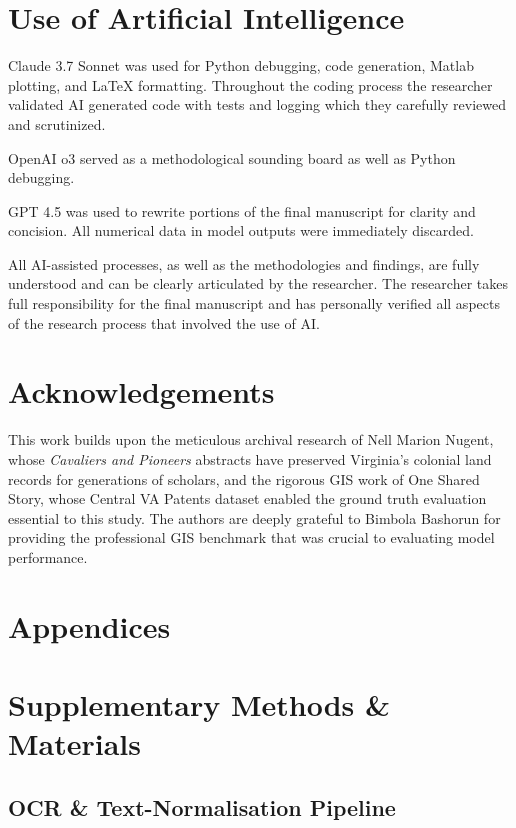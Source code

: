 \section{Use of Artificial
Intelligence}\label{use-of-artificial-intelligence}

Claude 3.7 Sonnet was used for Python debugging, code generation, Matlab
plotting, and LaTeX formatting. Throughout the coding process the
researcher validated AI generated code with tests and logging which they
carefully reviewed and scrutinized.

OpenAI o3 served as a methodological sounding board as well as Python
debugging.

GPT 4.5 was used to rewrite portions of the final manuscript for clarity
and concision. All numerical data in model outputs were immediately
discarded.

All AI-assisted processes, as well as the methodologies and findings,
are fully understood and can be clearly articulated by the researcher.
The researcher takes full responsibility for the final manuscript and
has personally verified all aspects of the research process that
involved the use of AI.

\section{Acknowledgements}\label{acknowledgements}

This work builds upon the meticulous archival research of Nell Marion
Nugent, whose \emph{Cavaliers and Pioneers} abstracts have preserved
Virginia's colonial land records for generations of scholars, and the
rigorous GIS work of One Shared Story, whose Central VA Patents dataset
enabled the ground truth evaluation essential to this study. The authors
are deeply grateful to Bimbola Bashorun \citep{Bashorun2025_gis} for
providing the professional GIS benchmark that was crucial to evaluating
model performance.

\section*{Appendices}\label{appendices}

\appendix\section{Supplementary Methods \&
Materials}\label{appendix-a-supplementary-methods-materials}

\subsection{OCR \& Text-Normalisation
Pipeline}\label{a.1-ocr-text-normalisation-pipeline}

